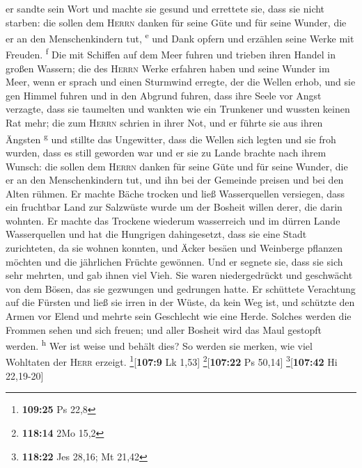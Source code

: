  er sandte sein Wort und machte sie gesund und errettete
sie, dass sie nicht starben:  die sollen dem
\textsc{Herrn} danken für seine Güte und für seine Wunder, die er an den
Menschenkindern tut, \textsuperscript{e}  und Dank opfern
und erzählen seine Werke mit Freuden. \textsuperscript{f}
 Die mit Schiffen auf dem Meer fuhren und trieben ihren
Handel in großen Wassern;  die des \textsc{Herrn} Werke
erfahren haben und seine Wunder im Meer,  wenn er sprach
und einen Sturmwind erregte, der die Wellen erhob,  und
sie gen Himmel fuhren und in den Abgrund fuhren, dass ihre Seele vor
Angst verzagte,  dass sie taumelten und wankten wie ein
Trunkener und wussten keinen Rat mehr;  die zum
\textsc{Herrn} schrien in ihrer Not, und er führte sie aus ihren Ängsten
\textsuperscript{g}  und stillte das Ungewitter, dass die
Wellen sich legten  und sie froh wurden, dass es still
geworden war und er sie zu Lande brachte nach ihrem Wunsch:
 die sollen dem \textsc{Herrn} danken für seine Güte und
für seine Wunder, die er an den Menschenkindern tut,  und
ihn bei der Gemeinde preisen und bei den Alten rühmen. 
Er machte Bäche trocken und ließ Wasserquellen versiegen,
 dass ein fruchtbar Land zur Salzwüste wurde um der
Bosheit willen derer, die darin wohnten.  Er machte das
Trockene wiederum wasserreich und im dürren Lande Wasserquellen
 und hat die Hungrigen dahingesetzt, dass sie eine Stadt
zurichteten, da sie wohnen konnten,  und Äcker besäen und
Weinberge pflanzen möchten und die jährlichen Früchte gewönnen.
 Und er segnete sie, dass sie sich sehr mehrten, und gab
ihnen viel Vieh.  Sie waren niedergedrückt und geschwächt
von dem Bösen, das sie gezwungen und gedrungen hatte.  Er
schüttete Verachtung auf die Fürsten und ließ sie irren in der Wüste, da
kein Weg ist,  und schützte den Armen vor Elend und
mehrte sein Geschlecht wie eine Herde.  Solches werden
die Frommen sehen und sich freuen; und aller Bosheit wird das Maul
gestopft werden. \textsuperscript{h}  Wer ist weise und
behält dies? So werden sie merken, wie viel Wohltaten der \textsc{Herr}
erzeigt. \footnote{\textbf{109:25} Ps 22,8}{[}\textbf{107:9} Lk 1,53{]}
\footnote{\textbf{118:14} 2Mo 15,2}{[}\textbf{107:22} Ps 50,14{]}
\footnote{\textbf{118:22} Jes 28,16; Mt 21,42}{[}\textbf{107:42} Hi
22,19-20{]}

